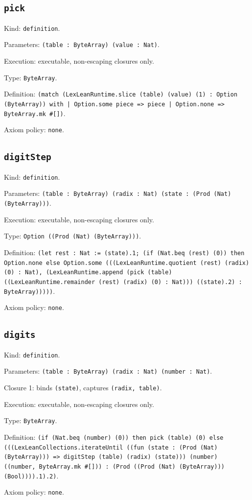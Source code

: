 \documentclass[11pt]{article}
\begin{document}
\subsection*{\texttt{pick}}
\noindent Kind: \texttt{definition}.\par
\noindent Parameters: \texttt{(table : ByteArray) (value : Nat)}.\par
\noindent Execution: executable, non-escaping closures only.\par
\noindent Type: \texttt{ByteArray}.\par
\noindent Definition: \texttt{(match (LexLeanRuntime.slice (table) (value) (1) : Option (ByteArray)) with | Option.some piece => piece | Option.none => ByteArray.mk \#[])}.\par
\noindent Axiom policy: \texttt{none}.\par
\subsection*{\texttt{digitStep}}
\noindent Kind: \texttt{definition}.\par
\noindent Parameters: \texttt{(table : ByteArray) (radix : Nat) (state : (Prod (Nat) (ByteArray)))}.\par
\noindent Execution: executable, non-escaping closures only.\par
\noindent Type: \texttt{Option ((Prod (Nat) (ByteArray)))}.\par
\noindent Definition: \texttt{(let rest : Nat := (state).1; (if (Nat.beq (rest) (0)) then Option.none else Option.some (((LexLeanRuntime.quotient (rest) (radix) (0) : Nat), (LexLeanRuntime.append (pick (table) ((LexLeanRuntime.remainder (rest) (radix) (0) : Nat))) ((state).2) : ByteArray)))))}.\par
\noindent Axiom policy: \texttt{none}.\par
\subsection*{\texttt{digits}}
\noindent Kind: \texttt{definition}.\par
\noindent Parameters: \texttt{(table : ByteArray) (radix : Nat) (number : Nat)}.\par
\noindent Closure 1: binds \texttt{(state)}, captures \texttt{(radix, table)}.\par
\noindent Execution: executable, non-escaping closures only.\par
\noindent Type: \texttt{ByteArray}.\par
\noindent Definition: \texttt{(if (Nat.beq (number) (0)) then pick (table) (0) else (((LexLeanCollections.iterateUntil ((fun (state : (Prod (Nat) (ByteArray))) => digitStep (table) (radix) (state))) (number) ((number, ByteArray.mk \#[])) : (Prod ((Prod (Nat) (ByteArray))) (Bool)))).1).2)}.\par
\noindent Axiom policy: \texttt{none}.\par
\end{document}
